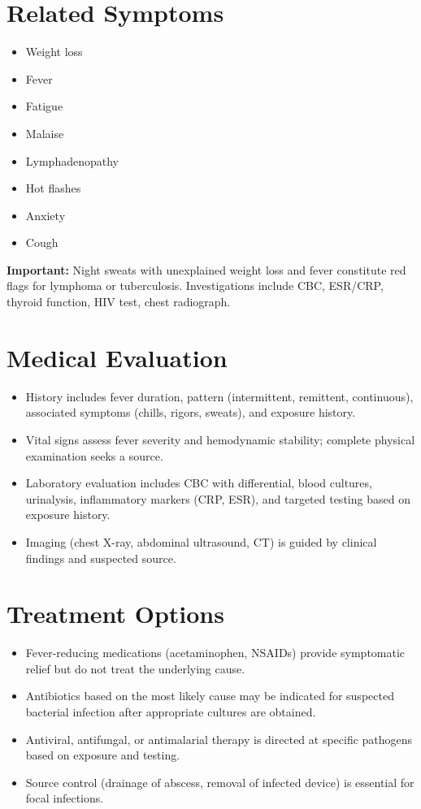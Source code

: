 \section*{Related Symptoms}
\begin{itemize}
  \item Weight loss
  \item Fever
  \item Fatigue
  \item Malaise
  \item Lymphadenopathy
  \item Hot flashes
  \item Anxiety
  \item Cough
\end{itemize}
\textbf{Important:} Night sweats with unexplained weight loss and fever constitute red flags for lymphoma or tuberculosis. Investigations include CBC, ESR/CRP, thyroid function, HIV test, chest radiograph.

\section*{Medical Evaluation}
\begin{itemize}
  \item History includes fever duration, pattern (intermittent, remittent, continuous), associated symptoms (chills, rigors, sweats), and exposure history.
  \item Vital signs assess fever severity and hemodynamic stability; complete physical examination seeks a source.
  \item Laboratory evaluation includes CBC with differential, blood cultures, urinalysis, inflammatory markers (CRP, ESR), and targeted testing based on exposure history.
  \item Imaging (chest X-ray, abdominal ultrasound, CT) is guided by clinical findings and suspected source.
\end{itemize}

\section*{Treatment Options}
\begin{itemize}
  \item Fever-reducing medications (acetaminophen, NSAIDs) provide symptomatic relief but do not treat the underlying cause.
  \item Antibiotics based on the most likely cause may be indicated for suspected bacterial infection after appropriate cultures are obtained.
  \item Antiviral, antifungal, or antimalarial therapy is directed at specific pathogens based on exposure and testing.
  \item Source control (drainage of abscess, removal of infected device) is essential for focal infections.
\end{itemize}


